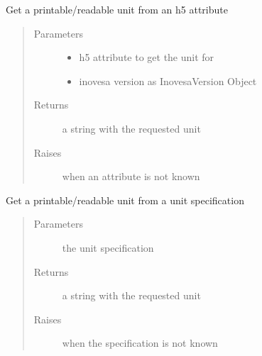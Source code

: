\documentclass[letterpaper,10pt,openany,oneside,english]{sphinxmanual}
\begin{document}
\begin{fulllineitems}
\label{\detokenize{utils:utils.unit_from_attr}}
Get a printable/readable unit from an h5 attribute
\begin{quote}\begin{description}
\item[{Parameters}] \leavevmode\begin{itemize}
\item {} 
 \textendash{} h5 attribute to get the unit for

\item {} 
 \textendash{} inovesa version as InovesaVersion Object

\end{itemize}

\item[{Returns}] \leavevmode
a string with the requested unit

\item[{Raises}] \leavevmode
{\hyperref[\detokenize{utils:utils.UnitError}]{}} \textendash{} when an attribute is not known

\end{description}\end{quote}

\end{fulllineitems}


\begin{fulllineitems}
\label{\detokenize{utils:utils.unit_from_spec}}
Get a printable/readable unit from a unit specification
\begin{quote}\begin{description}
\item[{Parameters}] \leavevmode
{} \textendash{} the unit specification

\item[{Returns}] \leavevmode
a string with the requested unit

\item[{Raises}] \leavevmode
{\hyperref[\detokenize{utils:utils.UnitError}]{}} \textendash{} when the specification is not known

\end{description}\end{quote}

\end{fulllineitems}
\end{document}
